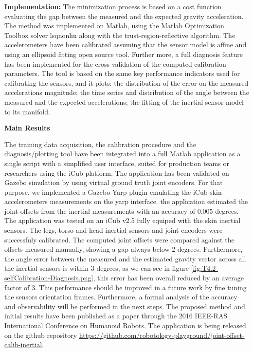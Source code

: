 \textbf*{Implementation:}
The minimization process is based on a cost function evaluating the gap between the measured and the expected gravity acceleration. The method was implemented on Matlab, using the Matlab Optimization Toolbox solver lsqnonlin along with the trust-region-reflective algorithm. The accelerometers  have been calibrated assuming that the sensor model is affine and using an ellipsoid fitting open source tool. Further more, a full diagnosis feature has been implemented for the cross validation of the computed calibration parameters. The tool is based on the same key performance indicators used for calibrating the sensors, and it plots: the distribution of the error on the measured accelerations magnitude; the time series and distribution of the angle between the measured and the expected accelerations; the fitting of the inertial sensor model to its manifold.

\textbf{Main Results}

The training data acquisition, the calibration procedure and the diagnosis/plotting tool have been integrated into a full Matlab application as a single script with a simplified user interface, suited for production teams or researchers using the iCub platform. The application has been validated on Gazebo simulation by using virtual ground truth joint encoders. For that purpose, we implemented a Gazebo-Yarp plugin emulating the iCub skin accelerometers measurements on the yarp interface. the application estimated the joint offsets from the inertial measurements with an accuracy of 0.005 degrees.
The application was tested on an iCub v2.5 fully equiped with the skin inertial sensors. The legs, torso and head inertial sensors and joint encoders were successfuly calibrated. The computed joint offsets were compared against the offsets measured manually, showing a gap always below 2 degrees. Furthermore, the angle error between the measured and the estimated gravity vector across all the inertial sensors is within 3 degrees, as we can see in figure \ref{fig:T4.2-selfCalibration-Diagnosis.png}, this error has been overall reduced by an average factor of 3. This performance should be improved in a future work by fine tuning the sensors orientation frames.
Furthermore, a formal analysis of the accuracy and observability will be performed in the next steps. The proposed method and initial results have been published as a paper \cite{GuedelhaSelfCalibJointOffsets2016} through the 2016 IEEE-RAS International Conference on Humanoid Robots. The application is being released on the github repository \url{https://github.com/robotology-playground/joint-offset-calib-inertial}.



